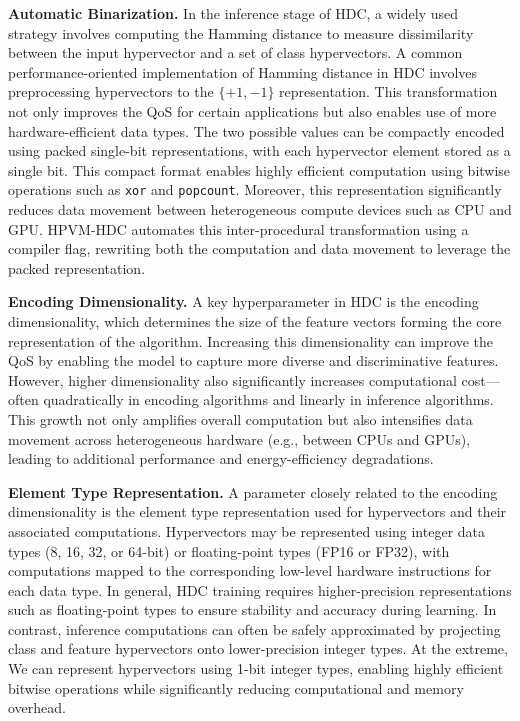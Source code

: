 \textbf{Automatic Binarization.} 
In the inference stage of HDC, a widely used strategy involves computing the Hamming distance to measure dissimilarity between the input hypervector and a set of class hypervectors. 
A common performance-oriented implementation of Hamming distance in HDC involves preprocessing hypervectors to the $\{+1, -1\}$ representation. This transformation not only improves the QoS for certain applications but also enables use of more hardware-efficient data types. The two possible values can be compactly encoded using packed single-bit representations, with each hypervector element stored as a single bit. This compact format enables highly efficient computation using bitwise operations such as \texttt{xor} and \texttt{popcount}.
Moreover, this representation significantly reduces data movement between heterogeneous compute devices such as CPU and GPU. HPVM-HDC automates this inter-procedural transformation using a compiler flag, rewriting both the computation and data movement to leverage the packed representation. 


\textbf{Encoding Dimensionality.} 
A key hyperparameter in HDC is the encoding dimensionality, which determines the size of the feature vectors forming the core representation of the algorithm. Increasing this dimensionality can improve the QoS by enabling the model to capture more diverse and discriminative features. However, higher dimensionality also significantly increases computational cost—often quadratically in encoding algorithms and linearly in inference algorithms. This growth not only amplifies overall computation but also intensifies data movement across heterogeneous hardware (e.g., between CPUs and GPUs), leading to additional performance and energy-efficiency degradations.

\textbf{Element Type Representation.}
A parameter closely related to the encoding dimensionality is the element type representation used for hypervectors and their associated computations. Hypervectors may be represented using integer data types (8, 16, 32, or 64-bit) or floating-point types (FP16 or FP32), with computations mapped to the corresponding low-level hardware instructions for each data type. In general, HDC training requires higher-precision representations such as floating-point types to ensure stability and accuracy during learning. In contrast, inference computations can often be safely approximated by projecting class and feature hypervectors onto lower-precision integer types. At the extreme, 
We can represent hypervectors using 1-bit integer types, enabling highly efficient bitwise operations while significantly reducing computational and memory overhead.

